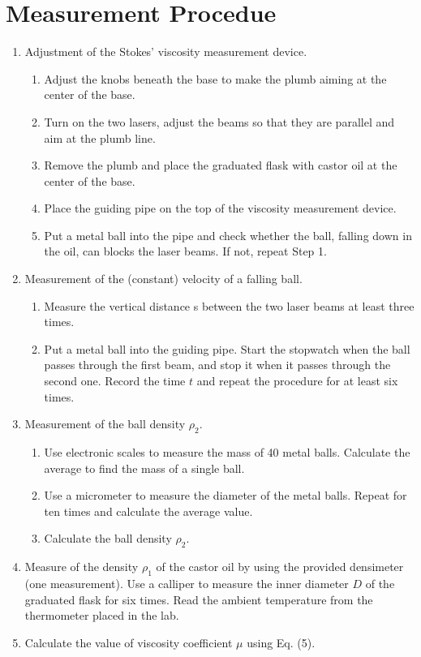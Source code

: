 \section{Measurement Procedue}


\begin{enumerate}
\item Adjustment of the Stokes’ viscosity measurement device.

\begin{enumerate}
\item Adjust the knobs beneath the base to make the plumb aiming at the center
  of the base. 
\item Turn on the two lasers, adjust the beams so that they are parallel and aim
  at the plumb line. 
\item Remove the plumb and place the graduated flask with castor oil at the
  center of the base. 
\item Place the guiding pipe on the top of the viscosity measurement device.
\item Put a metal ball into the pipe and check whether the ball, falling down in
  the oil, can blocks the laser beams. If not, repeat Step 1.
\end{enumerate}

\item Measurement of the (constant) velocity of a falling ball.

\begin{enumerate}
\item Measure the vertical distance s between the two laser beams at least three
  times. 
\item Put a metal ball into the guiding pipe. Start the stopwatch when the ball 
  passes through the first beam, and stop it when it passes through the second
  one. Record the time $t$ and repeat the procedure for at least six times. 
\end{enumerate}

\item Measurement of the ball density $\rho_2$.

\begin{enumerate}
\item Use electronic scales to measure the mass of 40 metal balls. Calculate the
  average to find the mass of a single ball. 
\item Use a micrometer to measure the diameter of the metal balls. Repeat for
  ten times and calculate the average value. 
\item Calculate the ball density $\rho_2$.
\end{enumerate}

\item Measure of the density $\rho_1$ of the castor oil by using the provided
  densimeter (one measurement). Use a calliper to measure the inner diameter $D$
  of the graduated flask for six times. Read the ambient temperature from the
  thermometer placed in the lab. 
\item Calculate the value of viscosity coefficient $\mu$ using Eq. (5).

\end{enumerate}

